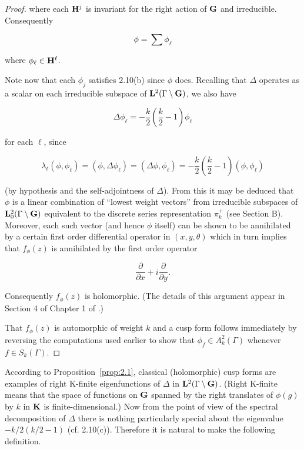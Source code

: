 \begin{proof}
where each $\mathbf{H}^{j}$ is invariant for the right action of $\mathbf{G}$ and irreducible. Consequently

\[
\phi = \sum \phi_{\ell}
\]

where $\phi_{\ell} \in \mathbf{H}^{\ell}$.

Note now that each $\phi_j$ satisfies 2.10(b) since $\phi$ does. Recalling that $\Delta$ operates as a scalar on each irreducible subspace of $\mathbf{L}^2(\Gamma \setminus \mathbf{G})$, we also have

\[
\Delta\phi_{\ell} = -\frac{k}{2}\left(\frac{k}{2} - 1\right)\phi_{\ell}
\]

for each $\ell$, since

\[
\lambda_{\ell}(\phi, \phi_{\ell}) = (\phi, \Delta\phi_{\ell}) = (\Delta\phi, \phi_{\ell}) = -\frac{k}{2}\left(\frac{k}{2} - 1\right)(\phi, \phi_{\ell})
\]

(by hypothesis and the self-adjointness of $\Delta$). From this it may be deduced that $\phi$ is a linear combination of ``lowest weight vectors'' from irreducible subspaces of $\mathbf{L}_0^2(\Gamma \setminus \mathbf{G})$ equivalent to the discrete series representation $\pi_k^{+}$ (see Section B). Moreover, each such vector (and hence $\phi$ itself) can be shown to be annihilated by a certain first order differential operator in $(x, y, \theta)$ which in turn implies that $f_{\phi}(z)$ is annihilated by the first order operator

\[
\frac{\partial}{\partial x} + i\frac{\partial}{\partial y}.
\]

Consequently $f_{\phi}(z)$ is holomorphic. (The details of this argument appear in Section 4 of Chapter 1 of \cite{GelfandGraevPyatetskiiShapiro}.)

That $f_{\phi}(z)$ is automorphic of weight $k$ and a cusp form follows immediately by reversing the computations used earlier to show that $\phi_f \in A_k^2(\Gamma)$ whenever $f \in S_k(\Gamma)$.

\end{proof}

According to Proposition~\ref{prop:2.1}, classical (holomorphic) cusp forms are examples of right K-finite eigenfunctions of $\Delta$ in $\mathbf{L}^2(\Gamma \setminus \mathbf{G})$. (Right K-finite means that the space of functions on $\mathbf{G}$ spanned by the right translates of $\phi(g)$ by $k$ in $\mathbf{K}$ is finite-dimensional.) Now from the point of view of the spectral decomposition of $\Delta$ there is nothing particularly special about the eigenvalue $-k/2(k/2 - 1)$ (cf. 2.10(c)). Therefore it is natural to make the following definition.

